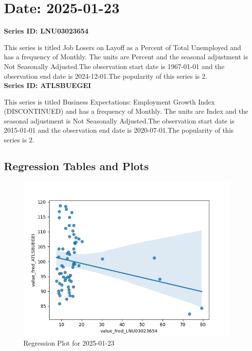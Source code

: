 \section{Date: 2025-01-23}
\noindent \textbf{Series ID: LNU03023654} 

\noindent This series is titled Job Losers on Layoff as a Percent of Total Unemployed and has a frequency of Monthly. The units are Percent and the seasonal adjustment is Not Seasonally Adjusted.The observation start date is 1967-01-01 and the observation end date is 2024-12-01.The popularity of this series is 2. \\ 

\noindent \textbf{Series ID: ATLSBUEGEI} 

\noindent This series is titled Business Expectations: Employment Growth Index (DISCONTINUED) and has a frequency of Monthly. The units are Index and the seasonal adjustment is Not Seasonally Adjusted.The observation start date is 2015-01-01 and the observation end date is 2020-07-01.The popularity of this series is 2. \\ 

\subsection{Regression Tables and Plots}


\begin{figure}
\centering
\includegraphics[scale = 0.9]{plots/plot_2025-01-23.png}
\caption{Regression Plot for 2025-01-23}
\end{figure}
\newpage
